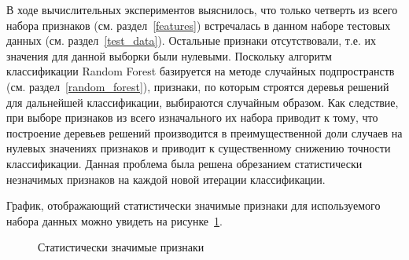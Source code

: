 В ходе вычислительных экспериментов выяснилось, что только четверть из всего набора признаков (см. раздел~\ref{features}) встречалась в данном наборе тестовых данных (см. раздел~\ref{test_data}). Остальные признаки отсутствовали, т.е. их значения для данной выборки были нулевыми. Поскольку алгоритм классификации Random Forest базируется на методе случайных подпространств (см. раздел~\ref{random_forest}), признаки, по которым строятся деревья решений для дальнейшей классификации, выбираются случайным образом. Как следствие, при выборе признаков из всего изначального их набора приводит к тому, что построение деревьев решений производится в преимущественной доли случаев на нулевых значениях признаков и приводит к существенному снижению точности классификации. Данная проблема была решена обрезанием статистически незначимых признаков на каждой новой итерации классификации.  

График, отображающий статистически значимые признаки для используемого набора данных можно увидеть на рисунке~\ref{important:important}.

\begin{figure}[h!]
\caption{ Статистически значимые признаки}
\label{important:important}
\end{figure} 
